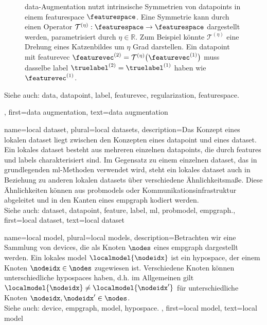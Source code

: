 {{{{{{\begin{figure}[H]
\begin{center}
\begin{tikzpicture}
			  \end{tikzpicture}
			  \vspace*{-11mm}
		\end{center}
		\caption{\Gls{data}-Augmentation nutzt intrinsische Symmetrien von \glspl{datapoint} in 
		    einem \gls{featurespace} $\featurespace$. Eine Symmetrie kann durch einen Operator 
		    $\mathcal{T}^{(\eta)}: \featurespace \rightarrow \featurespace$ dargestellt werden, 
		    parametrisiert durch $\eta \in \mathbb{R}$. Zum Beispiel könnte $\mathcal{T}^{(\eta)}$ eine 
		    Drehung eines Katzenbildes um $\eta$ Grad darstellen. Ein \gls{datapoint} mit 
		    \gls{featurevec} $\featurevec^{(2)} = \mathcal{T}^{(\eta)} \big(\featurevec^{(1)} \big)$ 
		    muss dasselbe \gls{label} $\truelabel^{(2)}=\truelabel^{(1)}$ haben wie 
		    $\featurevec^{(1)}$.\label{fig_symmetry_dataaug_dict}}
		 \end{figure}
		Siehe auch: \gls{data}, \gls{datapoint}, \gls{label}, \gls{featurevec}, \gls{regularization}, \gls{featurespace}. },
	first={data augmentation},
	text={data augmentation}
}

{name={local dataset}, plural={local datasets}, 
	description={Das Konzept eines lokalen \gls{dataset} liegt zwischen den Konzepten eines \gls{datapoint} und eines \gls{dataset}. Ein lokales \gls{dataset} besteht aus mehreren 
		einzelnen \glspl{datapoint}, die durch \glspl{feature} und \glspl{label} charakterisiert sind. 
		Im Gegensatz zu einem einzelnen \gls{dataset}, das in grundlegenden \gls{ml}-Methoden verwendet wird, 
		steht ein lokales \gls{dataset} auch in Beziehung zu anderen lokalen \glspl{dataset} über verschiedene 
		Ähnlichkeitsmaße. Diese Ähnlichkeiten können aus \glspl{probmodel} oder Kommunikationsinfrastruktur 
		abgeleitet und in den Kanten eines \gls{empgraph} kodiert werden.
				\\
		Siehe auch: \gls{dataset}, \gls{datapoint}, \gls{feature}, \gls{label}, \gls{ml}, \gls{probmodel}, \gls{empgraph}.},
	first={local dataset},
	text={local dataset}
}

{name={local model}, plural={local models}, 
	description={Betrachten wir eine Sammlung von \glspl{device}, die als Knoten $\nodes$ eines \gls{empgraph} dargestellt werden. Ein lokales \gls{model} $\localmodel{\nodeidx}$ 
	ist ein \gls{hypospace}, der einem Knoten $\nodeidx \in \nodes$ zugewiesen ist. Verschiedene Knoten können unterschiedliche \glspl{hypospace} haben, d.h. im Allgemeinen gilt 
	$\localmodel{\nodeidx} \neq \localmodel{\nodeidx'}$ für unterschiedliche Knoten 
	$\nodeidx, \nodeidx' \in \nodes$. 
				\\
		Siehe auch: \gls{device}, \gls{empgraph}, \gls{model}, \gls{hypospace}. },
	first={local model},
	text={local model}
}

}}}}
